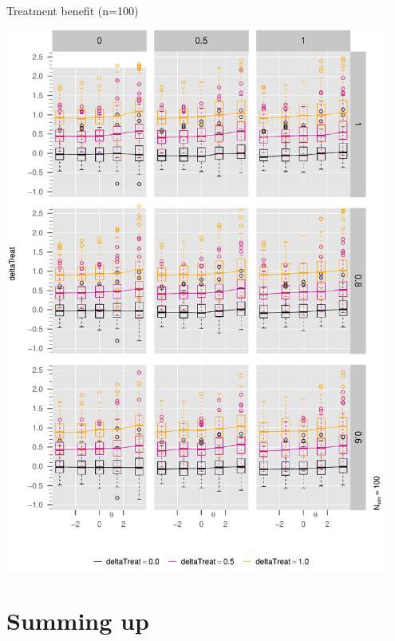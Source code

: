 \documentclass[10pt]{beamer}
\begin{document}
\begin{frame}[fragile]{Treatment benefit (n=100)}

\begin{center}
  \includegraphics[width=0.95\textwidth]{Figure4/mayplot_deltaTreat.pdf}
\end{center}

\end{frame}


\section*{Summing up}
\end{document}
